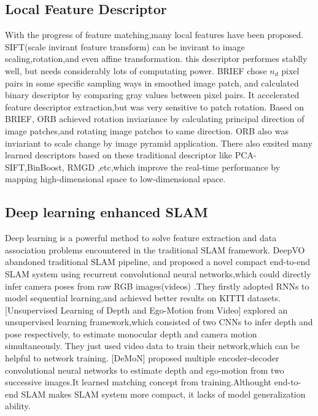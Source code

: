\documentclass[letterpaper, 10 pt, conference]{ieeeconf}  %
\begin{document}
\subsection{Local Feature Descriptor}
With the progress of feature matching,many local features have been proposed. SIFT(scale invirant feature transform) can be invirant to image scaling,rotation,and even affine transformation. this descriptor performes stablly well, but needs considerably lots of computating power. 
BRIEF chose $n_{d}$ pixel pairs in some specific sampling ways in smoothed image patch, and calculated binary descriptor by comparing gray values between pixel pairs. It accelerated feature descriptor extraction,but was very sensitive to patch rotation.  
Based on BRIEF, ORB achieved rotation inviariance by calculating principal direction of image patches,and rotating image patches to same direction. ORB also was inviariant to scale change by image pyramid application.
There also exsited many learned descriptors based on these traditional descriptor like PCA-SIFT,BinBoost, RMGD ,etc,which improve the real-time performance by mapping high-dimensional space to low-dimensional space. 


\subsection{Deep learning enhanced SLAM}
Deep learning is a powerful method to solve feature extraction and data association problems encountered in the traditional SLAM framework. 
DeepVO abandoned traditional SLAM pipeline, and proposed a novel compact end-to-end SLAM system using recurrent convolutional neural networks,which could directly infer camera poses from raw RGB images(videos) .They firstly adopted RNNs to model sequential learning,and achieved better results on KITTI datasets. 
[Unsupervised Learning of Depth and Ego-Motion from Video] explored an unsupervised learning framework,which consisted of two CNNs to infer depth and pose respectively, to estimate monocular depth and camera motion simultaneously. They just used video data to train their network,which can be helpful to network training.
[DeMoN] proposed multiple encoder-decoder convolutional neural networks to estimate depth and ego-motion from two successive images.It learned matching concept from training.Althought end-to-end SLAM makes SLAM system more compact, it lacks of model generalization ability.
\end{document}
